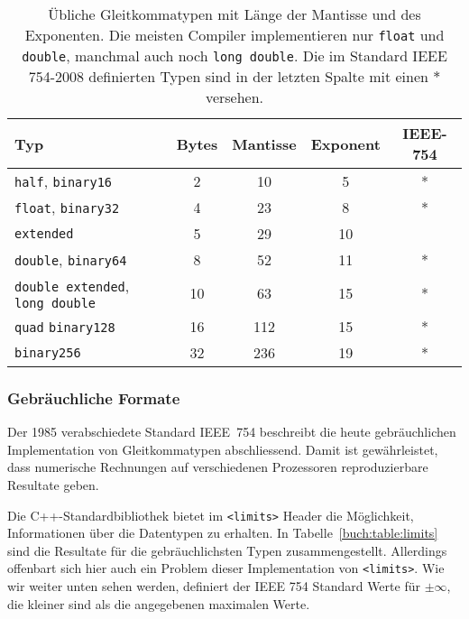 \begin{table}
\centering
\begin{tabular}{|l|c|c|c|c|}
\hline
Typ&Bytes&Mantisse&Exponent&IEEE-754\\
\hline
\texttt{half},
\texttt{binary16}    &\phantom{0}2& \phantom{0}10 & \phantom{0}5     & * \\
\texttt{float},
\texttt{binary32}    &\phantom{0}4& \phantom{0}23 & \phantom{0}8     & * \\
\texttt{extended} 
                     &\phantom{0}5& \phantom{0}29 & 10               &   \\
\texttt{double},
\texttt{binary64}    &\phantom{0}8& \phantom{0}52 & 11               & * \\
\texttt{double extended},
\texttt{long double} &          10& \phantom{0}63 & 15               & * \\
\texttt{quad}
\texttt{binary128}   &          16& 112           & 15               & * \\
\texttt{binary256}   &          32& 236           & 19               & * \\
\hline
\end{tabular}
\caption{Übliche Gleitkommatypen mit Länge der Mantisse und des Exponenten.
Die meisten Compiler implementieren nur \texttt{float} und \texttt{double},
manchmal auch noch \texttt{long double}.
Die im Standard IEEE 754-2008 definierten Typen sind in der letzten Spalte
mit einen $*$ versehen.
\label{buch:table:ieee754}}
\end{table}

\subsubsection{Gebräuchliche Formate}
Der 1985 verabschiedete Standard IEEE~754 beschreibt die heute gebräuchlichen
Implementation von Gleitkommatypen abschliessend.
Damit ist gewährleistet, dass numerische Rechnungen auf verschiedenen
Prozessoren reproduzierbare Resultate geben.

Die C++-Standardbibliothek bietet im \texttt{<limits>} Header die Möglichkeit, 
Informationen über die Datentypen zu erhalten.
In Tabelle~\ref{buch:table:limits} sind die Resultate für die
gebräuchlichsten Typen zusammengestellt.
Allerdings offenbart sich hier auch ein Problem dieser Implementation
von \texttt{<limits>}.
Wie wir weiter unten sehen werden, definiert der IEEE 754 Standard
Werte für $\pm\infty$, die kleiner sind als die angegebenen
maximalen Werte.

